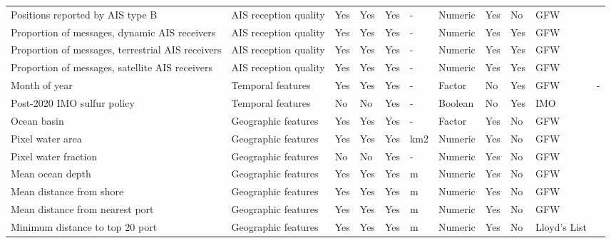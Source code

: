 \begin{table}[!h]
\begin{tabular}[t]{lllllllllll}
Positions reported by AIS type B & AIS reception quality & Yes & Yes & Yes & - & Numeric & Yes & No & GFW & \cite{kroodsma2018tracking}\\
Proportion of messages, dynamic AIS receivers & AIS reception quality & Yes & Yes & Yes & - & Numeric & Yes & Yes & GFW & \cite{kroodsma2018tracking}\\
Proportion of messages, terrestrial AIS receivers & AIS reception quality & Yes & Yes & Yes & - & Numeric & Yes & Yes & GFW & \cite{kroodsma2018tracking}\\
Proportion of messages, satellite AIS receivers & AIS reception quality & Yes & Yes & Yes & - & Numeric & Yes & Yes & GFW & \cite{kroodsma2018tracking}\\
\addlinespace
Month of year & Temporal features & Yes & Yes & Yes & - & Factor & No & Yes & GFW & -\\
Post-2020 IMO sulfur policy & Temporal features & No & No & Yes & - & Boolean & No & Yes & IMO & \cite{imo_sulphur_2020}\\
Ocean basin & Geographic features  & Yes & Yes & Yes & - & Factor & Yes & No & GFW & \cite{kroodsma2018tracking}\\
Pixel water area & Geographic features  & Yes & Yes & Yes & km2 & Numeric & Yes & No & GFW & \cite{paolo2024satellite}\\
Pixel water fraction & Geographic features & No & No & Yes & - & Numeric & Yes & No & GFW & \cite{paolo2024satellite}\\
\addlinespace
Mean ocean depth & Geographic features  & Yes & Yes & Yes & m & Numeric & Yes & No & GFW & \cite{kroodsma2018tracking}\\
Mean distance from shore & Geographic features  & Yes & Yes & Yes & m & Numeric & Yes & No & GFW & \cite{kroodsma2018tracking}\\
Mean distance from nearest port & Geographic features  & Yes & Yes & Yes & m & Numeric & Yes & No & GFW & \cite{kroodsma2018tracking}\\
Minimum distance to top 20 port & Geographic features  & Yes & Yes & Yes & m & Numeric & Yes & No & Lloyd’s List & \cite{LloydsListTopPorts2024}\\
\bottomrule
\end{tabular}
\end{table}
